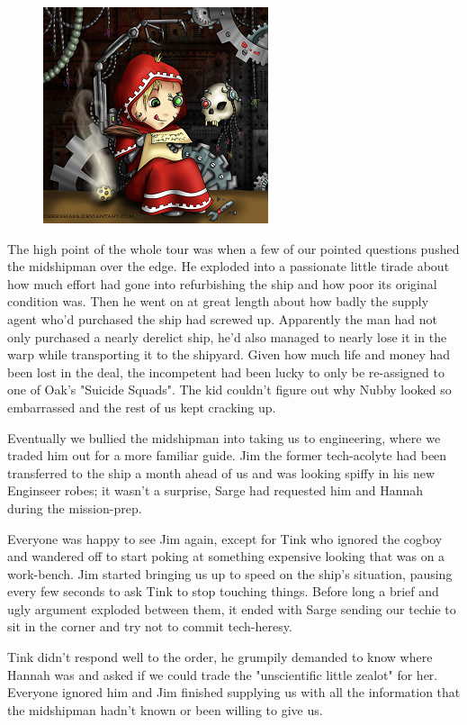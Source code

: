 \begin{figure}
	\begin{center}
		\includegraphics[width=\figwidth]{pics/10/6.png}
	\end{center}
\end{figure}
The high point of the whole tour was when a few of our pointed questions pushed the midshipman over the edge. 
He exploded into a passionate little tirade about how much effort had gone into refurbishing the ship and how poor its original condition was. 
Then he went on at great length about how badly the supply agent who'd purchased the ship had screwed up. 
Apparently the man had not only purchased a nearly derelict ship, he'd also managed to nearly lose it in the warp while transporting it to the shipyard. 
Given how much life and money had been lost in the deal, the incompetent had been lucky to only be re-assigned to one of Oak's "Suicide Squads". 
The kid couldn't figure out why Nubby looked so embarrassed and the rest of us kept cracking up.

Eventually we bullied the midshipman into taking us to engineering, where we traded him out for a more familiar guide. 
Jim the former tech-acolyte had been transferred to the ship a month ahead of us and was looking spiffy in his new Enginseer robes; 
it wasn't a surprise, Sarge had requested him and Hannah during the mission-prep. 


Everyone was happy to see Jim again, except for Tink who ignored the cogboy and wandered off to start poking at something expensive looking that was on a work-bench. 
Jim started bringing us up to speed on the ship's situation, pausing every few seconds to ask Tink to stop touching things. 
Before long a brief and ugly argument exploded between them, it ended with Sarge sending our techie to sit in the corner and try not to commit tech-heresy. 


Tink didn't respond well to the order, he grumpily demanded to know where Hannah was and asked if we could trade the "unscientific little zealot" for her. 
Everyone ignored him and Jim finished supplying us with all the information that the midshipman hadn't known or been willing to give us.

